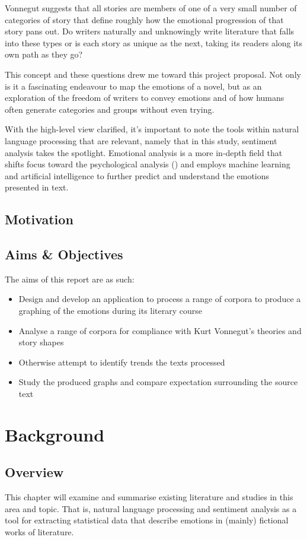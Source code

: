 \documentclass{article}
\begin{document}
        Vonnegut suggests that all stories are members of one of a very small number of categories of story that define roughly how the emotional progression of that story pans out. Do writers naturally and unknowingly write literature that falls into these types or is each story as unique as the next, taking its readers along its own path as they go?

        This concept and these questions drew me toward this project proposal. Not only is it a fascinating endeavour to map the emotions of a novel, but as an exploration of the freedom of writers to convey emotions and of how humans often generate categories and groups without even trying.

        With the high-level view clarified, it's important to note the tools within natural language processing that are relevant, namely that in this study, sentiment analysis takes the spotlight. Emotional analysis is a more in-depth field that shifts focus toward the psychological analysis (\cite{sentimentVsEmotionAnalysis}) and employs machine learning and artificial intelligence to further predict and understand the emotions presented in text.
    \subsection{Motivation}
    \subsection{Aims \& Objectives}
        The aims of this report are as such:
        \begin{itemize}
            \item Design and develop an application to process a range of corpora to produce a graphing of the emotions during its literary course
            \item Analyse a range of corpora for compliance with Kurt Vonnegut’s theories and story shapes
            \item Otherwise attempt to identify trends the texts processed
            \item Study the produced graphs and compare expectation surrounding the source text
        \end{itemize}
\newpage
\section{Background}
    \subsection{Overview}
        This chapter will examine and summarise existing literature and studies in this area and topic. That is, natural language processing and sentiment analysis as a tool for extracting statistical data that describe emotions in (mainly) fictional works of literature.
\end{document}
